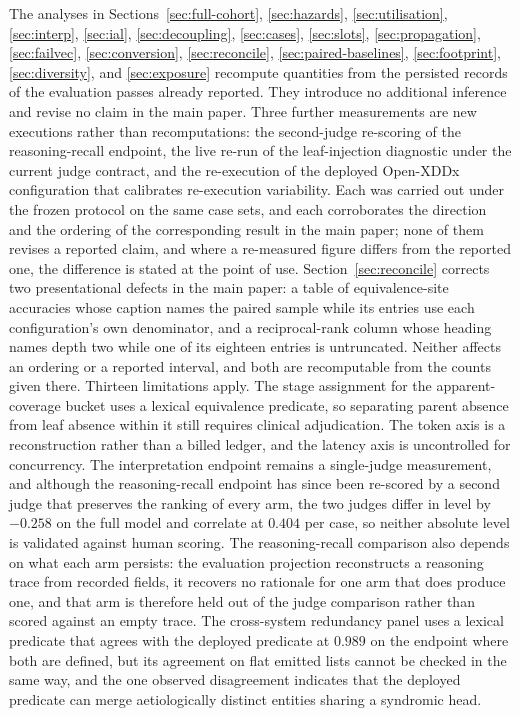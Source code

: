 \documentclass[letterpaper]{article}
\begin{document}
The analyses in Sections~\ref{sec:full-cohort}, \ref{sec:hazards}, \ref{sec:utilisation}, \ref{sec:interp}, \ref{sec:ial}, \ref{sec:decoupling}, \ref{sec:cases}, \ref{sec:slots}, \ref{sec:propagation}, \ref{sec:failvec}, \ref{sec:conversion}, \ref{sec:reconcile}, \ref{sec:paired-baselines}, \ref{sec:footprint}, \ref{sec:diversity}, and \ref{sec:exposure} recompute quantities from the persisted records of the evaluation passes already reported.
They introduce no additional inference and revise no claim in the main paper.
Three further measurements are new executions rather than recomputations: the second-judge re-scoring of the reasoning-recall endpoint, the live re-run of the leaf-injection diagnostic under the current judge contract, and the re-execution of the deployed Open-XDDx configuration that calibrates re-execution variability.
Each was carried out under the frozen protocol on the same case sets, and each corroborates the direction and the ordering of the corresponding result in the main paper; none of them revises a reported claim, and where a re-measured figure differs from the reported one, the difference is stated at the point of use.
Section~\ref{sec:reconcile} corrects two presentational defects in the main paper: a table of equivalence-site accuracies whose caption names the paired sample while its entries use each configuration's own denominator, and a reciprocal-rank column whose heading names depth two while one of its eighteen entries is untruncated.
Neither affects an ordering or a reported interval, and both are recomputable from the counts given there.
Thirteen limitations apply.
The stage assignment for the apparent-coverage bucket uses a lexical equivalence predicate, so separating parent absence from leaf absence within it still requires clinical adjudication.
The token axis is a reconstruction rather than a billed ledger, and the latency axis is uncontrolled for concurrency.
The interpretation endpoint remains a single-judge measurement, and although the reasoning-recall endpoint has since been re-scored by a second judge that preserves the ranking of every arm, the two judges differ in level by $-0.258$ on the full model and correlate at $0.404$ per case, so neither absolute level is validated against human scoring.
The reasoning-recall comparison also depends on what each arm persists: the evaluation projection reconstructs a reasoning trace from recorded fields, it recovers no rationale for one arm that does produce one, and that arm is therefore held out of the judge comparison rather than scored against an empty trace.
The cross-system redundancy panel uses a lexical predicate that agrees with the deployed predicate at $0.989$ on the endpoint where both are defined, but its agreement on flat emitted lists cannot be checked in the same way, and the one observed disagreement indicates that the deployed predicate can merge aetiologically distinct entities sharing a syndromic head.
\end{document}
